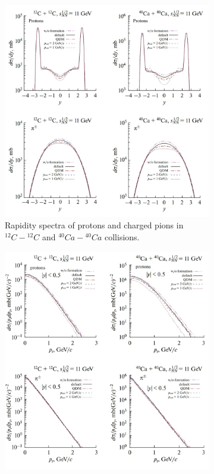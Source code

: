 \documentclass[12pt, twocolumn]{article}
\begin{document}
\begin{figure}[H]
\centering
\begin{subfigure}[h]{0.49\textwidth}
\centering
\includegraphics[scale=0.209]{ABRAMOV_Fig.36.jpg}
\caption{Rapidity spectra of protons and charged pions in $^{12}C-{^{12}C}$ and $^{40}Ca-{^{40}Ca}$ collisions.}
\label{ABRAMOV_Paper_Fig.36}
\end{subfigure}
\par
\hfill
\begin{subfigure}[h]{0.49\textwidth}
\centering
\includegraphics[scale=0.209]{ABRAMOV_Fig.37.jpg}

\end{subfigure}
\end{figure}
\end{document}
